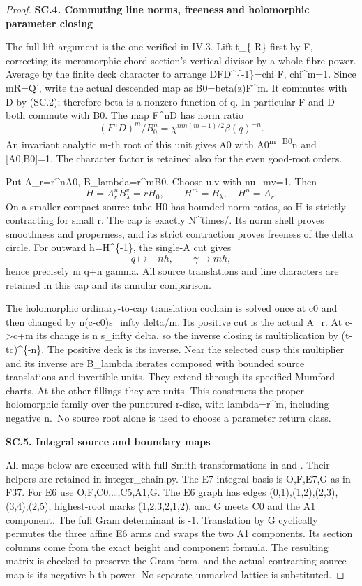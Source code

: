 \begin{proof}
\medskip\noindent\textbf{SC.4. Commuting line norms, freeness and holomorphic parameter closing}

The full lift argument is the one verified in IV.3. Lift t\_\{-R\}
first by F, correcting its meromorphic chord section's vertical
divisor by a whole-fibre power. Average by the finite deck character
to arrange DFD\^{}\{-1\}=chi F, chi\^{}m=1. Since mR=Q', write the actual
descended map as B0=beta(z)F\^{}m. It commutes with D by (SC.2);
therefore beta is a nonzero function of q. In particular F and D
both commute with B0. The map F\^{}nD has norm ratio
\[
 (F^nD)^m/B_0^n=\chi^{nm(m-1)/2}\beta(q)^{-n}.
\]
An invariant analytic m-th root of this unit gives A0 with
A0\textsuperscript{m=B0}n and {[}A0,B0{]}=1. The character factor is retained also
for the even good-root orders.

Put A\_r=r\^{}nA0, B\_lambda=r\^{}mB0. Choose u,v with nu+mv=1.
Then
\[
 H=A_r^uB_\lambda^v=rH_0,\qquad H^m=B_\lambda,\quad H^n=A_r.
\]
On a smaller compact source tube H0 has bounded norm ratios, so
H is strictly contracting for small \textbar r\textbar. The cap is exactly
N\^{}times/. Its norm shell proves smoothness and properness,
and its strict contraction proves freeness of the delta circle.
For outward h=H\^{}\{-1\}, the single-A cut gives
\[
                         q\mapsto-nh,\qquad\gamma\mapsto mh,
\]
hence precisely m q+n gamma. All source translations and line
characters are retained in this cap and its annular comparison.

The holomorphic ordinary-to-cap translation cochain is solved
once at c0 and then changed by n(c-c0)s\_infty delta/m.
Its positive cut is the actual A\_r. At c-\textgreater c+m its change is
n s\_infty delta, so the inverse closing is multiplication by
(t-tc)\^{}\{-n\}. The positive deck is its inverse. Near the selected
cusp this multiplier and its inverse are B\_lambda iterates
composed with bounded source translations and invertible units.
They extend through its specified Mumford charts. At the other
fillings they are units. This constructs the proper holomorphic
family over the punctured r-disc, with lambda=r\^{}m, including
negative n.~No source root alone is used to choose a parameter
return class.

\par

\medskip\noindent\textbf{SC.5. Integral source and boundary maps}

All maps below are executed with full Smith transformations in
 and
. Their helpers are retained in
integer\_chain.py. The E7 integral basis is O,F,E7,G as in F37.
For E6 use O,F,C0,\ldots,C5,A1,G. The E6 graph has edges
(0,1),(1,2),(2,3),(3,4),(2,5), highest-root marks
(1,2,3,2,1,2), and G meets C0 and the A1 component.
The full Gram determinant is -1. Translation by G cyclically
permutes the three affine E6 arms and swaps the two A1 components.
Its section columns come from the exact height and component
formula. The resulting matrix is checked to preserve the Gram
form, and the actual contracting source map is its negative b-th
power. No separate unmarked lattice is substituted.


\end{proof}
